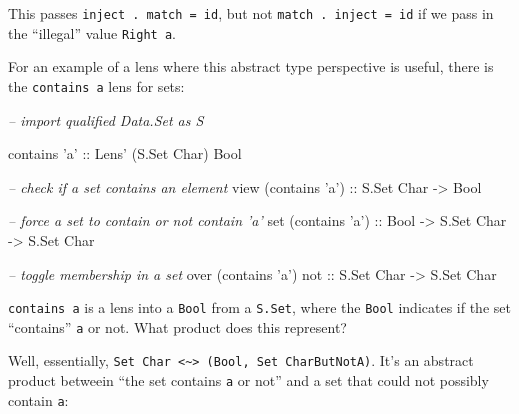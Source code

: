 \documentclass[]{article}
\newenvironment{Shaded}{}{}
\newcommand{\CharTok}[1]{\textcolor[rgb]{0.25,0.44,0.63}{#1}}
\newcommand{\CommentTok}[1]{\textcolor[rgb]{0.38,0.63,0.69}{\textit{#1}}}
\newcommand{\DataTypeTok}[1]{\textcolor[rgb]{0.56,0.13,0.00}{#1}}
\newcommand{\NormalTok}[1]{#1}
\newcommand{\OtherTok}[1]{\textcolor[rgb]{0.00,0.44,0.13}{#1}}
\begin{document}
This passes \texttt{inject\ .\ match\ =\ id}, but not
\texttt{match\ .\ inject\ =\ id} if we pass in the ``illegal'' value
\texttt{Right\ \textquotesingle{}a\textquotesingle{}}.

For an example of a lens where this abstract type perspective is useful, there
is the \texttt{contains\ \textquotesingle{}a\textquotesingle{}} lens for sets:

\begin{Shaded}
\begin{Highlighting}[]
\CommentTok{-- import qualified Data.Set as S}

\NormalTok{contains }\CharTok{'a'}\OtherTok{ ::} \DataTypeTok{Lens'}\NormalTok{ (}\DataTypeTok{S.Set} \DataTypeTok{Char}\NormalTok{) }\DataTypeTok{Bool}

\CommentTok{-- check if a set contains an element}
\NormalTok{view (contains }\CharTok{'a'}\NormalTok{)}\OtherTok{ ::} \DataTypeTok{S.Set} \DataTypeTok{Char} \OtherTok{->} \DataTypeTok{Bool}

\CommentTok{-- force a set to contain or not contain 'a'}
\NormalTok{set (contains }\CharTok{'a'}\NormalTok{)}\OtherTok{ ::} \DataTypeTok{Bool} \OtherTok{->} \DataTypeTok{S.Set} \DataTypeTok{Char} \OtherTok{->} \DataTypeTok{S.Set} \DataTypeTok{Char}

\CommentTok{-- toggle membership in a set}
\NormalTok{over (contains }\CharTok{'a'}\NormalTok{)}\OtherTok{ not ::} \DataTypeTok{S.Set} \DataTypeTok{Char} \OtherTok{->} \DataTypeTok{S.Set} \DataTypeTok{Char}
\end{Highlighting}
\end{Shaded}

\texttt{contains\ \textquotesingle{}a\textquotesingle{}} is a lens into a
\texttt{Bool} from a \texttt{S.Set}, where the \texttt{Bool} indicates if the
set ``contains'' \texttt{a} or not. What product does this represent?

Well, essentially,
\texttt{Set\ Char\ \textless{}\textasciitilde{}\textgreater{}\ (Bool,\ Set\ CharButNotA)}.
It's an abstract product betweein ``the set contains
\texttt{\textquotesingle{}a\textquotesingle{}} or not'' and a set that could not
possibly contain \texttt{\textquotesingle{}a\textquotesingle{}}:
\end{document}
